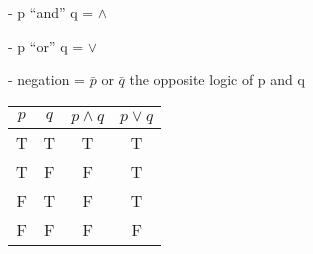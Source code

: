 \documentclass[10pt,letterpaper]{article}
\begin{document}
{\begin{enumerate}
 - p ``and'' q = $\wedge$
 
 - p ``or'' q  = $\vee$
 
 - negation = $\bar{p}$ or $\bar{q}$ \quad the opposite logic of p and q
 
 \vspace{1em}
 
 \begin{table}[h!]
    \label{tab:table2}
    \begin{tabular}{c|c|c|c} %
      $p$ & $q$ & ${p} \wedge {q}$  &  ${p} \vee {q}$\\
      \hline
      T & T &  T & T\\
      T & F &  F & T\\
      F & T &  F & T\\
      F & F &  F & F\\
    \end{tabular}
\end{table}
 
    
\end{enumerate}
}
\end{document}
